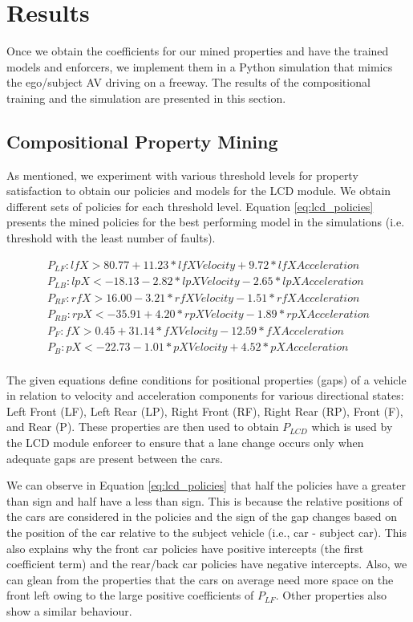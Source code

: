 \section{Results}
\label{sec:av_results}
Once we obtain the coefficients for our mined properties and have the trained models and enforcers, we implement them in a Python simulation that mimics the ego/subject AV driving on a freeway. The results of the compositional training and the simulation are presented in this section.


\subsection{Compositional Property Mining}

As mentioned, we experiment with various threshold levels for property satisfaction to obtain our policies and models for the LCD module. We obtain different sets of policies for each threshold level. Equation \ref{eq:lcd_policies} presents the mined policies for the best performing model in the simulations (i.e. threshold with the least number of faults).

\begin{equation}
\begin{aligned}
P_{LF}: lfX > 80.77 + 11.23*lfXVelocity + 9.72*lfXAcceleration\\
P_{LB}: lpX < -18.13  -2.82*lpXVelocity  -2.65*lpXAcceleration\\
P_{RF}: rfX > 16.00  -3.21*rfXVelocity -1.51*rfXAcceleration\\
P_{RB}: rpX < -35.91 + 4.20*rpXVelocity -1.89*rpXAcceleration\\
P_{F}: fX > 0.45 + 31.14*fXVelocity -12.59*fXAcceleration\\
P_{B}: pX < -22.73  -1.01*pXVelocity + 4.52*pXAcceleration\\
\end{aligned}
\label{eq:lcd_policies}
\end{equation}

The given equations define conditions for positional properties (gaps) of a vehicle in relation to velocity and acceleration components for various directional states: Left Front (LF), Left Rear (LP), Right Front (RF), Right Rear (RP), Front (F), and Rear (P). These properties are then used to obtain $P_{LCD}$ which is used by the LCD module enforcer to ensure that a lane change occurs only when adequate gaps are present between the cars. 

We can observe in Equation \ref{eq:lcd_policies} that half the policies have a greater than sign and half have a less than sign. This is because the relative positions of the cars are considered in the policies and the sign of the gap changes based on the position of the car relative to the subject vehicle (i.e., car - subject car). This also explains why the front car policies have positive intercepts (the first coefficient term) and the rear/back car policies have negative intercepts. Also, we can glean from the properties that the cars on average need more space on the front left owing to the large positive coefficients of $P_{LF}$. Other properties also show a similar behaviour.


